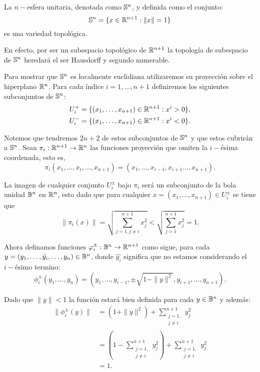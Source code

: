 \begin{example}[$n-$Esfera]\label{Ex: Variedad Topologica - Esfera}
	La $n-$esfera unitaria, denotada como $\S^n$, y definida como el conjunto:
	\[
		\S^n = \{x \in \R^{n+1}: \| x \| = 1 \}
	\]
	es una variedad topológica.

	En efecto, por ser un subespacio topológico de $\R^{n+1}$ la topología de subespacio de $\S^n$ heredará el ser Hausdorff y segundo numerable.

	Para mostrar que $\S^n$ es localmente euclidiana utilizaremos su proyección sobre el hiperplano $\R^{n}$. Para cada índice $i=1, \hdots, n+1$ definiremos los siguientes subconjuntos de $\S^n$:
	\begin{align*}
		U_{i}^{+} & = \{(x_1,\hdots,x_{n+1}) \in \R^{n+1}: x^i > 0\}, \\
		U_{i}^{-} & = \{(x_1,\hdots,x_{n+1}) \in \R^{n+1}: x^i < 0\}.
	\end{align*}

	Notemos que tendremos $2n + 2$ de estos subconjuntos de $\S^n$ y que estos cubrirán a $\S^n$. Sean $\pi_i: \R^{n+1} \to \R^n$ las funciones proyección que omiten la $i-$ésima coordenada, esto es,
	\[
		\pi_i(x_1,\hdots,x_i,\hdots,x_{n+1}) = (x_1,\hdots,x_{i-1},x_{i+1}\hdots,x_{n+1}).
	\]

	La imagen de cualquier conjunto $U_{i}^{\pm}$ bajo $\pi_i$ será un subconjunto de la bola unidad $\B^n$ en $\R^n$, esto dado que para cualquier $x=(x_1, \hdots, x_{n+1}) \in U_{i}^{\pm}$ se tiene que
	\[
		\|\pi_i(x)\| = \sqrt{\sum_{j=1, j\neq i}^{n+1} x_j^2} < \sqrt{\sum_{j=1}^{n+1} x_j^2} = 1.
	\]

	Ahora definamos funciones $\phi_i^{\pm}: \B^n \to \R^{n+1}$ como sigue, para cada $y=(y_1, \dots, \hat{y_i}, \dots, y_n) \in \B^n$, donde $\hat{y_i}$ significa que no estamos considerando el $i-$ésimo termino:
	\[
		\phi_{i}^{\pm}(y_1, \hdots, y_n) =  (y_1, \hdots, y_{i-1}, \pm\sqrt{1 - \|y\|^2}, y_{i+1}, \hdots, y_{n+1}).
	\]

	Dado que $\|y\| < 1$ la función estará bien definida para cada $y \in \B^n$ y además:
	\begin{align*}
		\|\phi_i^{\pm}(y)\| & = (1 + \| y \|^{2}) + \sum_{\substack{j=1, \\ j \neq i}}^{n+1} y_j^2 \\
		                    & = \left(
		1 - \sum_{\substack{j=1,                                         \\ j \neq i}}^{n+1} y_j^2
		\right) + \sum_{\substack{j=1,                                   \\ j \neq i}}^{n+1} y_j^2 \\
		                    & = 1.
	\end{align*}


\end{example}
